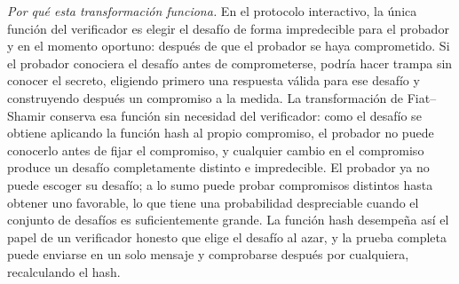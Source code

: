 \begin{itemize}
    \textit{Por qué esta transformación funciona.} En el protocolo interactivo, la única función del verificador es elegir el desafío de forma impredecible para el probador y en el momento oportuno: después de que el probador se haya comprometido. Si el probador conociera el desafío antes de comprometerse, podría hacer trampa sin conocer el secreto, eligiendo primero una respuesta válida para ese desafío y construyendo después un compromiso a la medida. La transformación de Fiat--Shamir conserva esa función sin necesidad del verificador: como el desafío se obtiene aplicando la función hash al propio compromiso, el probador no puede conocerlo antes de fijar el compromiso, y cualquier cambio en el compromiso produce un desafío completamente distinto e impredecible. El probador ya no puede escoger su desafío; a lo sumo puede probar compromisos distintos hasta obtener uno favorable, lo que tiene una probabilidad despreciable cuando el conjunto de desafíos es suficientemente grande. La función hash desempeña así el papel de un verificador honesto que elige el desafío al azar, y la prueba completa puede enviarse en un solo mensaje y comprobarse después por cualquiera, recalculando el hash.
\end{itemize}

